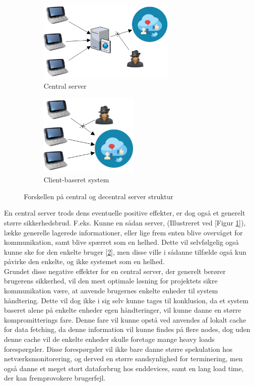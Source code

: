 \begin{figure}[H]
    \begin{subfigure}{0.5\textwidth}
        \centering
        \includegraphics[width=1\linewidth, height=4cm]{Projectdoc/Assets/Illustrationer/Security_diagram_1.png} 
        \caption{Central server}
        \label{fig:central_server}
    \end{subfigure}
    \begin{subfigure}{0.5\textwidth}
        \centering
        \includegraphics[width=0.7\linewidth, height=4cm]{Projectdoc/Assets/Illustrationer/Security_diagram_2.png}
        \caption{Client-baseret system}
        \label{fig:decentral_server}
    \end{subfigure}
    \caption{Forskellen på central og decentral server struktur}
    \label{fig:serverstruktur}
\end{figure}

En central server trods dens eventuelle positive effekter, er dog også et generelt større sikkerhedsbrud. F.eks. Kunne en sådan server, (Illustreret ved [Figur \ref{fig:central_server}]), lække generelle lagerede informationer, eller lige frem enten blive overvåget for kommunikation, samt blive spærret som en helhed. Dette vil selvfølgelig også kunne ske for den enkelte bruger [\ref{fig:decentral_server}], men disse ville i sådanne tilfælde også kun påvirke den enkelte, og ikke systemet som en helhed.\\
Grundet disse negative effekter for en central server, der generelt berører brugerens sikkerhed, vil den mest optimale løsning for projektets sikre kommunikation være, at anvende brugernes enkelte enheder til system håndtering. Dette vil dog ikke i sig selv kunne tages til konklusion, da et system baseret alene på enkelte enheder egen håndteringer, vil kunne danne en større kompromitterings fare. Denne fare vil kunne opstå ved anvendes af lokalt cache for data fetching, da denne information vil kunne findes på flere nodes, dog uden denne cache vil de enkelte enheder skulle foretage mange heavy loads forespørgsler. Disse forespørgsler vil ikke bare danne større spekulation hos netværksmonitorering, og derved en større sandsynlighed for terminering, men også danne et meget stort dataforbrug hos enddevices, samt en lang load time, der kan fremprovokere brugerfejl.

